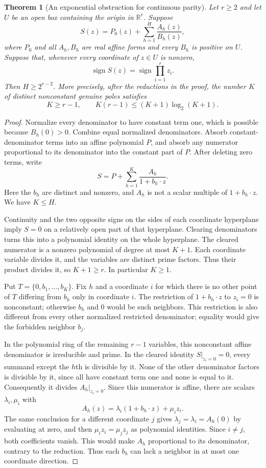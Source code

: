 \documentclass[11pt]{article}
\newtheorem{theorem}{Theorem}
\begin{document}
\begin{theorem}[An exponential obstruction for continuous parity]
Let $r\ge2$ and let $U$ be an open box containing the origin in
$\mathbb R^r$. Suppose
\[
 S(z)=P_0(z)+\sum_{h=1}^H\frac{A_h(z)}{B_h(z)},
\]
where $P_0$ and all $A_h,B_h$ are real affine forms and every $B_h$ is positive
on $U$. Suppose that, whenever every coordinate of $z\in U$ is nonzero,
\[
 \operatorname{sign}S(z)=\operatorname{sign}\prod_{i=1}^r z_i.
\]
Then $H\ge2^{r-2}$. More precisely, after the reductions in the proof,
the number $K$ of distinct nonconstant genuine poles satisfies
\[
 K\ge r-1,\qquad K(r-1)\le(K+1)\log_2(K+1).
\]
\end{theorem}
\begin{proof}
Normalize every denominator to have constant term one, which is possible
because $B_h(0)>0$. Combine equal normalized denominators. Absorb
constant-denominator terms into an affine polynomial $P$, and absorb any
numerator proportional to its denominator into the constant part of $P$.
After deleting zero terms, write
\[
 S=P+\sum_{h=1}^K\frac{A_h}{1+b_h\cdot z}.
\]
Here the $b_h$ are distinct and nonzero, and $A_h$ is not a scalar
multiple of $1+b_h\cdot z$. We have $K\le H$.

Continuity and the two opposite signs on the sides of each coordinate
hyperplane imply $S=0$ on a relatively open part of that hyperplane.
Clearing denominators turns this into a polynomial identity on the
whole hyperplane. The cleared numerator is a nonzero polynomial of
degree at most $K+1$. Each coordinate variable divides it, and the
variables are distinct prime factors. Thus their product divides it,
so $K+1\ge r$. In particular $K\ge1$.

Put $T=\{0,b_1,\ldots,b_K\}$. Fix $h$ and a coordinate $i$ for which
there is no other point of $T$ differing from $b_h$ only in coordinate
$i$. The restriction of $1+b_h\cdot z$ to $z_i=0$ is nonconstant;
otherwise $b_h$ and $0$ would be such neighbors. This restriction is
also different from every other normalized restricted denominator;
equality would give the forbidden neighbor $b_j$.

In the polynomial ring of the remaining $r-1$ variables, this
nonconstant affine denominator is irreducible and prime. In the cleared
identity $S|_{z_i=0}=0$, every summand except the $h$th is divisible by
it. None of the other denominator factors is divisible by it, since
all have constant term one and none is equal to it. Consequently it
divides $A_h|_{z_i=0}$. Since this numerator is affine, there are scalars
$\lambda_i,\mu_i$ with
\[
 A_h(z)=\lambda_i(1+b_h\cdot z)+\mu_i z_i.
\]
The same conclusion for a different coordinate $j$ gives
$\lambda_j=\lambda_i=A_h(0)$ by evaluating at zero, and then
$\mu_i z_i=\mu_j z_j$ as polynomial identities. Since $i\ne j$, both
coefficients vanish. This would make $A_h$ proportional to its
denominator, contrary to the reduction. Thus each $b_h$ can lack a
neighbor in at most one coordinate direction.


\end{proof}
\end{document}
